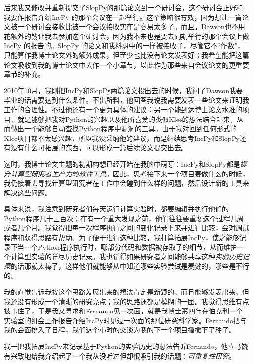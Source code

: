 \documentclass[12pt,UTF8,nofonts]{book}
\begin{document}
后来我又修改并重新提交了SlopPy的那篇论文到一个研讨会，这个研讨会正好和我要作报告介绍IncPy 的那个会议在一起举行。这个策略很有效，因为想让一篇论文被一个研讨会接收比被一个会议接收实在是容易太多了。而且，Dawson也不用花额外的钱让我去参加这个研讨会，因为我本来也是要去同期举行的那个会议上做IncPy 的报告的。\href{http://www.pgbovine.net/projects/pubs/guo_woda11_camera_ready.pdf}{SlopPy 的论文}和我料想中的一样被接收了，尽管它不“作数”，只能算作我博士论文外的额外成果，但至少也比没有论文发表好；我希望能把这篇论文吸收到我的博士论文中去作一个小章节，以此作为那些来自会议论文的更重要章节的补充。

\breakline

2010年10月，我刚把IncPy和SlopPy两篇论文投出去的时候，我问了Dawson我要毕业的话需要达到什么条件。不出所料，他回答我说我需要发表一些论文来证明我工作的合理性。不过他还有一个更为具体的建议：另一个能到达博士论文水准的项目，就是能够把我对Python的兴趣以及他所喜爱的类似Klee的想法结合起来，从而做出一个能够自动查找Python程序中漏洞的工具。由于我对回到任何形式的Klee项目都不太感兴趣，所以我没采纳他的建议，而是继续思考IncPy和SlopPy还有没有什么可拓展的东西，可以形成一篇后续论文提交出去。

这时，我博士论文主题的初期构想已经开始在我脑中萌芽：IncPy和SlopPy都是\emph{提升计算型研究者生产力的软件工具}。因此，思考接下来一个项目要做什么的时候，我仍接着去寻找计算型研究者在工作中会碰到什么样的问题，然后设计新的工具来解决这些问题。

具体来说，我注意到研究者们每天运行计算实验时，都要编辑并执行他们的Python程序几十上百次；在有一个重大发现之前，他们往往要重复这个过程几周或者几个月。我觉得把每一次程序执行之间的变化记录下来并进行比较，会对调试程序和获得思路有帮助。为了便于进行这种比较，我打算拓展IncPy，使之能够记录下当一个Python程序执行时，哪部分代码和数据被存取了的细节，从而维护一个计算型实验的详尽历史记录。我也觉得如果研究者之间能够共享这种\emph{实验历史记录}的话那就太棒了，这样他们就能够从中知道哪些实验尝试是奏效的，哪些是不行的。

我的直觉告诉我按这个思路发展出来的想法肯定是新颖的，而且能够发表出来，但我还没有形成一个清晰的研究亮点；我的思路还都是模糊的一团。我觉得思维有点被卡住了，于是我又寻求和Fernando见一次面，就是我博士第四年在伯克利一个实验室的组会上作报告介绍IncPy时见过一次面的那位研究科学家。Fernando把与我的会面排入了日程，我们这个小时的交谈为我的下一个项目播撒下了种子。

\breakline

我一把我拓展IncPy来记录基于Python的实验历史的想法告诉Fernando，他立马饶有兴致地给我介绍起了一个我从没听过但却很吸引我的话题：\emph{可重复性研究}。
\end{document}
